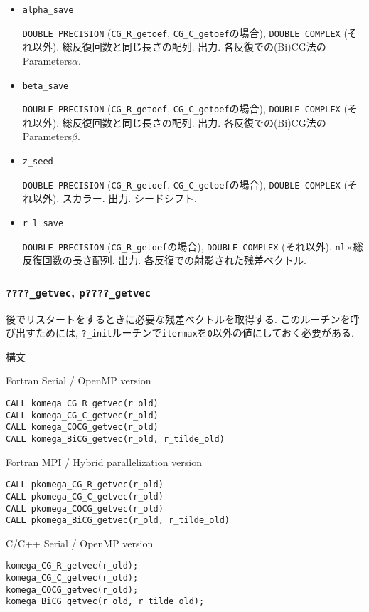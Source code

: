 \documentclass[12pt,titlepage]{article}
\begin{document}
\begin{itemize}
\item \verb|alpha_save|

  \verb|DOUBLE PRECISION| (\verb|CG_R_getoef|, \verb|CG_C_getoef|の場合),
  \verb|DOUBLE COMPLEX| (それ以外).
  総反復回数と同じ長さの配列. 出力. 各反復での(Bi)CG法のParameters$\alpha$.

\item \verb|beta_save|

  \verb|DOUBLE PRECISION| (\verb|CG_R_getoef|, \verb|CG_C_getoef|の場合),
  \verb|DOUBLE COMPLEX| (それ以外).
  総反復回数と同じ長さの配列. 出力. 各反復での(Bi)CG法のParameters$\beta$.

\item \verb|z_seed|

  \verb|DOUBLE PRECISION| (\verb|CG_R_getoef|, \verb|CG_C_getoef|の場合),
  \verb|DOUBLE COMPLEX| (それ以外).
  スカラー. 出力. シードシフト.

\item \verb|r_l_save|
  
  \verb|DOUBLE PRECISION| (\verb|CG_R_getoef|の場合),
  \verb|DOUBLE COMPLEX| (それ以外).
  \verb|nl|$\times$総反復回数の長さ配列. 出力.
  各反復での射影された残差ベクトル.
\end{itemize}

\subsubsection{\texttt{????\_getvec}, \texttt{p????\_getvec}}

後でリスタートをするときに必要な残差ベクトルを取得する.
このルーチンを呼び出すためには,
\verb|?_init|ルーチンで\verb|itermax|を\verb|0|以外の値にしておく必要がある.

\noindent 構文

\noindent Fortran Serial / OpenMP version
\begin{verbatim}
CALL komega_CG_R_getvec(r_old)
CALL komega_CG_C_getvec(r_old)
CALL komega_COCG_getvec(r_old)
CALL komega_BiCG_getvec(r_old, r_tilde_old)
\end{verbatim}

\noindent Fortran MPI / Hybrid parallelization version
\begin{verbatim}
CALL pkomega_CG_R_getvec(r_old)
CALL pkomega_CG_C_getvec(r_old)
CALL pkomega_COCG_getvec(r_old)
CALL pkomega_BiCG_getvec(r_old, r_tilde_old)
\end{verbatim}

\noindent C/C++ Serial / OpenMP version
\begin{verbatim}
komega_CG_R_getvec(r_old);
komega_CG_C_getvec(r_old);
komega_COCG_getvec(r_old);
komega_BiCG_getvec(r_old, r_tilde_old);
\end{verbatim}
\end{document}
